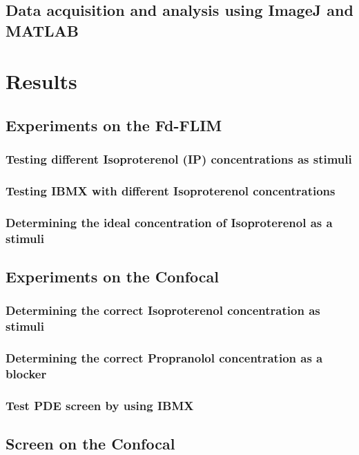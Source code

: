 \documentclass[a4paper,11pt,oneside]{book}
\begin{document}
\section{Data acquisition and analysis using ImageJ and MATLAB }


\newpage
\chapter{Results}
\section{Experiments on the Fd-FLIM}
\subsection{Testing different Isoproterenol (IP) concentrations as stimuli}


\subsection{Testing IBMX with different Isoproterenol concentrations}


\subsection{Determining the ideal concentration of Isoproterenol as a stimuli}


\section{Experiments on the Confocal}
\subsection{Determining the correct Isoproterenol concentration as stimuli}


\subsection{Determining the correct Propranolol concentration as a blocker}


\subsection{Test PDE screen by using IBMX}


\section{Screen on the Confocal}
\end{document}
